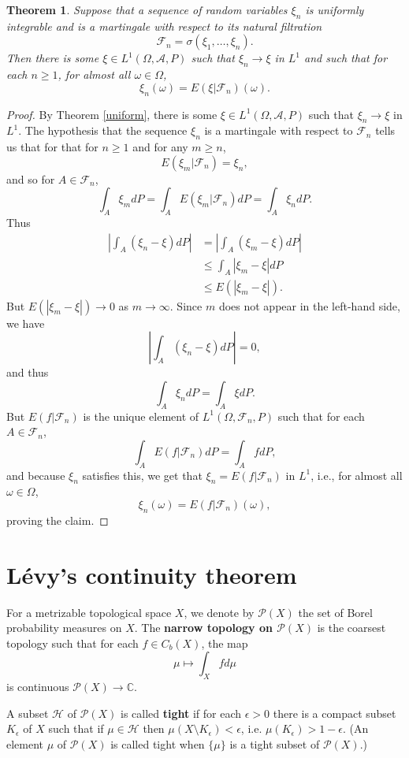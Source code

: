 \documentclass{article}
\newtheorem{theorem}{Theorem}
\theoremstyle{definition}
\begin{document}
\begin{theorem}
Suppose that a sequence of random variables $\xi_n$ is uniformly integrable and is a martingale with respect
to its natural filtration
\[
\mathscr{F}_n=\sigma(\xi_1,\ldots,\xi_n).
\]
Then there is some $\xi \in L^1(\Omega,\mathscr{A},P)$ such that $\xi_n \to \xi$ in $L^1$ and such that for each $n \geq 1$,
for almost all $\omega \in \Omega$,
\[
\xi_n(\omega) = E(\xi|\mathscr{F}_n)(\omega).
\]
\label{universal}
\end{theorem}
\begin{proof}
By Theorem \ref{uniform}, there is some $\xi \in L^1(\Omega,\mathscr{A},P)$ such that
$\xi_n \to \xi$ in $L^1$. 
The hypothesis that the sequence $\xi_n$ is a martingale with respect to $\mathscr{F}_n$ 
tells us that for 
that for $n \geq 1$ and for
any $m \geq n$,
\[
E(\xi_m|\mathscr{F}_n) = \xi_n,
\]
and so for $A \in \mathscr{F}_n$,
\[
\int_A \xi_m dP = \int_A  E(\xi_m|\mathscr{F}_n) dP = 
\int_A \xi_n dP.
\]
Thus
\begin{align*}
\left| \int_A (\xi_n - \xi) dP \right|&=\left| \int_A (\xi_m - \xi) dP \right|\\
&\leq \int_A |\xi_m-\xi| dP\\
&\leq E(|\xi_m-\xi|).
\end{align*}
But $E(|\xi_m-\xi|) \to 0$ as $m \to \infty$. Since $m$ does not appear in the left-hand side, we have
\[
\left| \int_A (\xi_n - \xi) dP \right| = 0,
\]
and thus
\[
\int_A \xi_n dP = \int_A \xi dP.
\]
But $E(f|\mathscr{F}_n)$ is the unique element of $L^1(\Omega,\mathscr{F}_n,P)$ such that for
each $A \in \mathscr{F}_n$,
\[
\int_A E(f|\mathscr{F}_n) dP = \int_A f dP,
\]
and because $\xi_n$ satisfies this, we get that $\xi_n = E(f|\mathscr{F}_n)$ in $L^1$, i.e., 
for almost all $\omega \in \Omega$,
\[
\xi_n(\omega) = E(f|\mathscr{F}_n)(\omega),
\]
proving the claim.
\end{proof}




\section{L\'evy's continuity theorem}
For a metrizable topological space $X$, we denote by $\mathscr{P}(X)$ the set of Borel
probability measures on $X$. The \textbf{narrow topology on $\mathscr{P}(X)$} is the coarsest topology
such that for each $f \in C_b(X)$, the map
\[
\mu \mapsto \int_X f d\mu
\]
is continuous $\mathscr{P}(X) \to \mathbb{C}$. 

A subset $\mathscr{H}$ of $\mathscr{P}(X)$ is called \textbf{tight} if for each $\epsilon>0$ there is a compact
subset $K_\epsilon$ of $X$ such that if $\mu \in \mathscr{H}$ then
$\mu(X \setminus K_\epsilon) < \epsilon$, i.e. $\mu(K_\epsilon)>1-\epsilon$. (An element $\mu$ of $\mathscr{P}(X)$ is called tight
when $\{\mu\}$ is a tight subset of $\mathscr{P}(X)$.)
\end{document}
